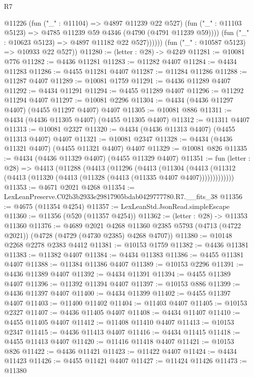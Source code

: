 \begin{lexlean}{R7}
\begin{coremodule}
                @11226
                  (fun ("_" : @11104) => @4897 @11239 @22 @527)
                  (fun ("_" : @11103 @5123) => @4785 @11239 @59 @4346 (@4790 (@4791 @11239 @59))))
                (fun ("_" : @10623 @5123) => @4897 @11182 @22 @527))))))
      (fun ("_" : @10587 @5123) => @10933 @22 @527))
@11280 := (letter : @28) -> @4249
@11281 := @10081 @776
@11282 := @4436 @11281
@11283 := @11282 @4407
@11284 := @4434 @11283
@11286 := @4455 @11281 @4407
@11287 := @11284 @11286
@11288 := @11287 @4407
@11289 := @10081 @1759
@11291 := @4436 @11289 @4407
@11292 := @4434 @11291
@11294 := @4455 @11289 @4407
@11296 := @11292 @11294 @4407
@11297 := @10081 @2296
@11304 := @4434 (@4436 @11297 @4407) (@4455 @11297 @4407) @4407
@11305 := @10081 @886
@11311 := @4434 (@4436 @11305 @4407) (@4455 @11305 @4407)
@11312 := @11311 @4407
@11313 := @10081 @2327
@11320 := @4434 (@4436 @11313 @4407) (@4455 @11313 @4407) @4407
@11321 := @10081 @2347
@11328 := @4434 (@4436 @11321 @4407) (@4455 @11321 @4407) @4407
@11329 := @10081 @826
@11335 := @4434 (@4436 @11329 @4407) (@4455 @11329 @4407)
@11351 := fun (letter : @28) =>
  @4413
    (@11288
      (@4413
        (@11296
          (@4413
            (@11304
              (@4413 (@11312 (@4413 (@11320 (@4413 (@11328 (@4413 (@11335 @4407 @4407)))))))))))))
@11353 := @4671 @2021 @4268
@11354 := LexLeanPreserve.C02b3b2933e29817905bdab0429777780.R7.__fits_38
@11356 := @4675 (@11354 @4254)
@11357 := LexLeanStd.JsonRead.simpleEscape
@11360 := @11356 (@520 (@11357 @4254))
@11362 := (letter : @28) -> @11353 @11360
@11376 := @4689
    @2021
    @4268
    @11360
    @2385
    @5793
    (@4713 (@4722 @2021))
    (@4728 (@4729 (@4730 @2385) @4268 @4707))
@11380 := @10148 @2268 @2278 @2383 @4412
@11381 := @10153 @1759
@11382 := @4436 @11381
@11383 := @11382 @4407
@11384 := @4434 @11383
@11386 := @4455 @11381 @4407
@11388 := @11384 @11386 @4407
@11389 := @10153 @2296
@11391 := @4436 @11389 @4407
@11392 := @4434 @11391
@11394 := @4455 @11389 @4407
@11396 := @11392 @11394 @4407
@11397 := @10153 @886
@11399 := @4436 @11397 @4407
@11400 := @4434 @11399
@11402 := @4455 @11397 @4407
@11403 := @11400 @11402
@11404 := @11403 @4407
@11405 := @10153 @2327
@11407 := @4436 @11405 @4407
@11408 := @4434 @11407
@11410 := @4455 @11405 @4407
@11412 := @11408 @11410 @4407
@11413 := @10153 @2347
@11415 := @4436 @11413 @4407
@11416 := @4434 @11415
@11418 := @4455 @11413 @4407
@11420 := @11416 @11418 @4407
@11421 := @10153 @826
@11422 := @4436 @11421
@11423 := @11422 @4407
@11424 := @4434 @11423
@11426 := @4455 @11421 @4407
@11427 := @11424 @11426
@11473 := @11380

\end{coremodule}
\end{lexlean}
